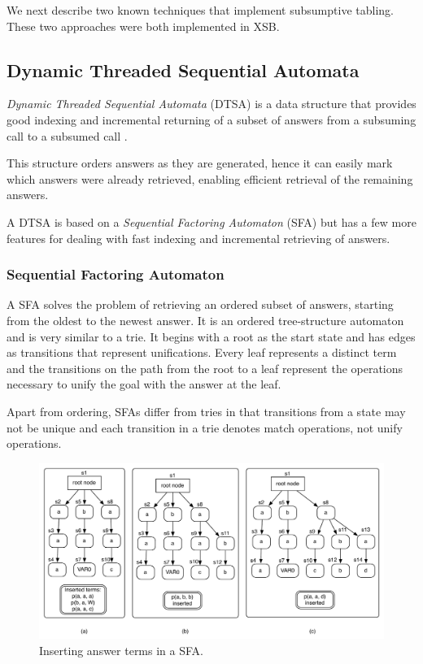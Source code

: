 We next describe two known techniques that implement subsumptive tabling. These two approaches were
both implemented in XSB.

\subsection{Dynamic Threaded Sequential Automata}\label{sec:dtsa}

\textit{Dynamic Threaded Sequential Automata} (DTSA) is a data structure that provides good indexing
and incremental returning of a subset of answers from a subsuming call to a subsumed call \cite{Rao-96}.

This structure orders answers as they are generated, hence it can easily mark which answers were
already retrieved, enabling efficient retrieval of the remaining answers.

A DTSA is based on a \textit{Sequential Factoring Automaton} (SFA) \cite{Dawnson-95} but has a few more
features for dealing with fast indexing and incremental retrieving of answers.

\subsubsection{Sequential Factoring Automaton}

A SFA solves the problem of retrieving an ordered subset of answers, starting from the oldest to the
newest answer. It is an ordered tree-structure automaton and is very similar to a trie. It begins with
a root as the start state and has edges as transitions that represent unifications. Every leaf represents
a distinct term and the transitions on the path from the root to a leaf represent the operations necessary
to unify the goal with the answer at the leaf.

Apart from ordering, SFAs differ from tries in that transitions from a state may not be unique and each
transition in a trie denotes match operations, not unify operations.

\begin{figure}[ht]
  \centering
    \includegraphics[scale=0.6]{sfa.pdf}
  \caption{Inserting answer terms in a SFA.}
  \label{fig:sfa_example}
\end{figure}

